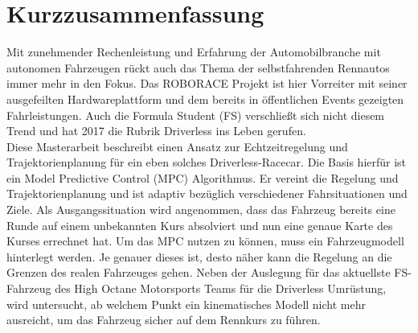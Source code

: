 
\chapter*{Kurzzusammenfassung}

Mit zunehmender Rechenleistung und Erfahrung der Automobilbranche mit autonomen Fahrzeugen rückt auch das Thema der selbstfahrenden Rennautos immer mehr in den Fokus. Das ROBORACE Projekt ist hier Vorreiter mit seiner ausgefeilten Hardwareplattform und dem bereits in öffentlichen Events gezeigten Fahrleistungen. Auch die Formula Student (FS) verschließt sich nicht diesem Trend und hat 2017 die Rubrik Driverless ins Leben gerufen. \\
Diese Masterarbeit beschreibt einen Ansatz zur Echtzeitregelung und Trajektorienplanung für ein eben solches Driverless-Racecar. Die Basis hierfür ist ein Model Predictive Control (MPC) Algorithmus. Er vereint die Regelung und Trajektorienplanung und ist adaptiv bezüglich verschiedener Fahrsituationen und Ziele.
Als Ausgangssituation wird angenommen, dass das Fahrzeug bereits eine Runde auf einem unbekannten Kurs absolviert und nun eine genaue Karte des Kurses errechnet hat. 
Um das MPC nutzen zu können, muss ein Fahrzeugmodell hinterlegt werden. Je genauer dieses ist, desto näher kann die Regelung an die Grenzen des realen Fahrzeuges gehen. Neben der Auslegung für das aktuellste FS-Fahrzeug des High Octane Motorsports Teams für die Driverless Umrüstung, wird untersucht, ab welchem Punkt ein kinematisches Modell nicht mehr ausreicht, um das Fahrzeug sicher auf dem Rennkurs zu führen.


